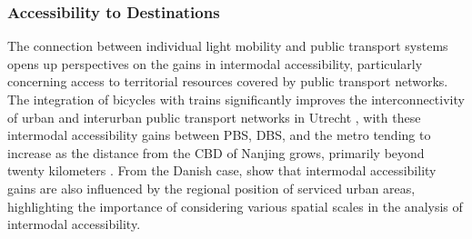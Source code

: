 \begin{refsegment}
\subsubsection*{Accessibility to Destinations
    \label{chap2:accessibilite-destinations}
    }

The connection between individual light mobility and public transport systems opens up perspectives on the gains in intermodal accessibility, particularly concerning access to territorial resources covered by public transport networks. The integration of bicycles with trains significantly improves the interconnectivity of urban and interurban public transport networks in Utrecht \textcolor{blue}{\autocite[273]{krygsman_multimodal_2004}}, with these intermodal accessibility gains between \acrshort{PBS}, \acrshort{DBS}, and the metro tending to increase as the distance from the \acrshort{CBD} of Nanjing grows, primarily beyond twenty kilometers \textcolor{blue}{\autocite[8]{cheng_comparison_2023}}. From the Danish case, \textcolor{blue}{\textcite[42]{nielsen_bikeability_2018}} show that intermodal accessibility gains are also influenced by the regional position of serviced urban areas, highlighting the importance of considering various spatial scales in the analysis of intermodal accessibility.%


\end{refsegment}
